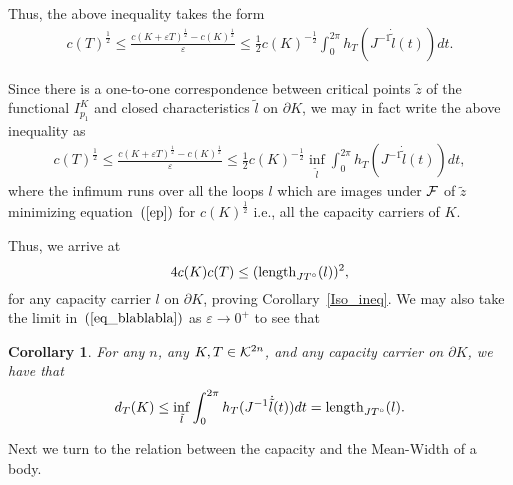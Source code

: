 \documentclass[12pt]{article}
\newtheorem{corollary}[lemma]{Corollary}
\def\eps{\varepsilon}
\begin{document}
Thus, the above inequality takes the form
 \begin{eqnarray*}  c(T)^{\frac 1 2} \leq
\frac{c(K+ \eps T)^{\frac 1 2} -  c(K)^{\frac 1 2}}{\eps} \le {\frac
{1} {2}} c(K)^{-\frac {1} 2}
\int_0^{2 \pi} h_T(J^{-1}\dot{\tilde{l}}(t))dt.%
\end{eqnarray*}


Since there is a one-to-one correspondence between critical points
${\tilde z}$ of the functional $I_{p_1}^K$ and closed
characteristics $\tilde l$ on $\partial K$,
 we may in fact write the above inequality as
 \begin{eqnarray} \label{eq_blablabla} c(T)^{\frac 1 2} \leq
\frac{c(K+ \eps T)^{\frac 1 2} -  c(K)^{\frac 1 2}}{\eps} \le {\frac
{1} {2}} c(K)^{-\frac {1} 2} \inf_{\tilde{l}}
\int_0^{2 \pi} h_T(J^{-1} \dot{\tilde{l}}(t))dt, %
\end{eqnarray}
where the infimum runs over all the loops $l$ which are images under
${\cal F}$ of $\tilde{z}$ minimizing equation~$(\ref{ep})$ for
$c(K)^{\frac 1 2}$ i.e., all the capacity carriers of $K$.

Thus, we arrive at
\[ 4 c(K) c(T) \le ({\rm length}_{JT^{\circ}} (l))^2,\]
for any capacity carrier $l$ on $\partial K$, proving
Corollary~\ref{Iso_ineq}. We may also take the limit in~$(\ref{eq_blablabla})$ as $\eps \to 0^+$
to see that

\begin{corollary}
For any $n$, any $K,T \in {\cal K}^{2n}$, and any capacity carrier
on $\partial K$, we have that
\begin{eqnarray*}
d_T(K) \le
 \inf_{\tilde{l}}  \int_0^{2 \pi} h_{T}(J^{-1}
\dot{\tilde{l}}(t))dt =  {\rm length}_{JT^{\circ}} (l).
\end{eqnarray*}
\end{corollary}

Next we turn to the relation between the capacity and the Mean-Width
of a body.
\end{document}
